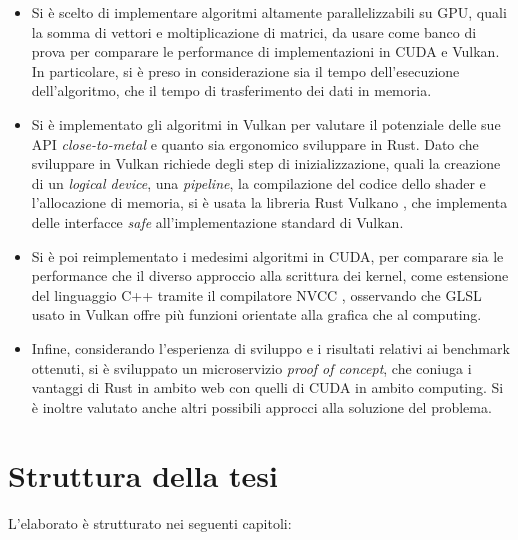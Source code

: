 \begin{itemize}
    \item Si è scelto di implementare algoritmi altamente parallelizzabili su \gls{GPU}, quali la somma di vettori e moltiplicazione di matrici, da usare come banco di prova per comparare le performance di implementazioni in \gls{CUDA} e Vulkan. In particolare, si è preso in considerazione sia il tempo dell'esecuzione dell'algoritmo, che il tempo di trasferimento dei dati in memoria.
    \item Si è implementato gli algoritmi in Vulkan per valutare il potenziale delle sue \gls{API} \textit{close-to-metal} e quanto sia ergonomico sviluppare in Rust. Dato che sviluppare in Vulkan richiede degli step di inizializzazione, quali la creazione di un \textit{logical device}, una \textit{pipeline}, la compilazione del codice dello shader e l'allocazione di memoria, si è usata la libreria Rust Vulkano \cite[]{Rust:Vulkano}, che implementa delle interfacce \textit{safe} all'implementazione standard di Vulkan.
    \item Si è poi reimplementato i medesimi algoritmi in \gls{CUDA}, per comparare sia le performance che il diverso approccio alla scrittura dei kernel, come estensione del linguaggio C++ tramite il compilatore \gls{NVCC} \cite[]{NVIDIA:nvcc}, osservando che \gls{GLSL} \cite[]{KG:GLSL} usato in Vulkan offre più funzioni orientate alla grafica che al computing.
    \item Infine, considerando l'esperienza di sviluppo e i risultati relativi ai benchmark ottenuti, si è sviluppato un microservizio \textit{proof of concept}, che coniuga i vantaggi di Rust in ambito web con quelli di \gls{CUDA} in ambito computing. Si è inoltre valutato anche altri possibili approcci alla soluzione del problema.
\end{itemize}

\newpage

\section[Struttura della tesi]{Struttura della tesi}

L'elaborato è strutturato nei seguenti capitoli:

